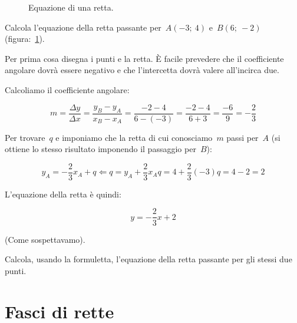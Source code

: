\begin{exrig}
 \begin{esempio}

  \begin{inaccessibleblock}
 \begin{figure}[h]
    \centering
    \caption{Equazione di una retta.}\label{fig:equazione}
  \end{figure}
\end{inaccessibleblock}

Calcola l'equazione della retta passante per~$A(-3;~4)$ e~$B(6;~-2)$ 
(figura:~\ref{fig:equazione}).

Per prima cosa disegna i punti e la retta. È facile prevedere che il 
coefficiente angolare dovrà essere negativo e che l'intercetta dovrà valere
all'incirca due. 

Calcoliamo il coefficiente angolare:

\[m = \frac{\Delta y}{\Delta x} = \frac{y_B - y_A}{x_B - x_A} =
      \frac{-2 - 4}{6 -(-3)} = \frac{-2 - 4}{6 + 3} = \frac{-6}{9} = 
      - \frac{2}{3}
\]

Per trovare~$q$ e imponiamo che la retta di cui conosciamo~$m$ passi per~$A$ 
(si ottiene lo stesso risultato imponendo il passaggio per~$B$):

\[y_A = - \frac{2}{3} x_A + q \Leftarrow 
    q = y_A +\frac{2}{3} x_A  
    q = 4 +\frac{2}{3} (-3) 
    q = 4 - 2 = 2 
\]

L'equazione della retta è quindi:

\[y = - \frac{2}{3} x + 2\]

(Come sospettavamo).
 \end{esempio}

% 

 \begin{esempio}
  Calcola, usando la formuletta, l'equazione della retta passante per gli 
  stessi due punti.
 \end{esempio}
\end{exrig}

\section{Fasci di rette}
\label{sec:retta_fasci}

